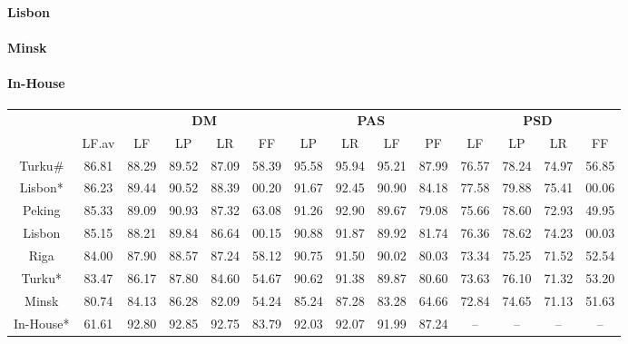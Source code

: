 \paragraph{Lisbon} 

\paragraph{Minsk}

\paragraph{In-House}


\begin{table}
    \centering
    \smaller[]
    \smaller[]
    \smaller[0.5]
    \begin{tabular}{@{}cccccccccccccc@{}}
        \toprule
        \multicolumn{1}{c}{ }
        & \multicolumn{1}{c}{ }
        & \multicolumn{4}{c}{\textbf{DM}}
        & \multicolumn{4}{c}{\textbf{PAS}}
        & \multicolumn{4}{c}{\textbf{PSD}} \\
        \cmidrule(lr){3-6}
        \cmidrule(lr){7-10}
        \cmidrule(lr){11-14}
        &
        LF.av &
        LF & LP & LR & FF &
        LP & LR & LF & PF &
        LF & LP & LR & FF \\
        \midrule
        Turku\# & 86.81 & 88.29 & 89.52 & 87.09 & 58.39 & 95.58 & 95.94 & 95.21 & 87.99 & 76.57 & 78.24 & 74.97 & 56.85 \\
        Lisbon* & 86.23 & 89.44 & 90.52 & 88.39 & 00.20 & 91.67 & 92.45 & 90.90 & 84.18 & 77.58 & 79.88 & 75.41 & 00.06 \\
        Peking & 85.33 & 89.09 & 90.93 & 87.32 & 63.08 & 91.26 & 92.90 & 89.67 & 79.08 & 75.66 & 78.60 & 72.93 & 49.95 \\
        Lisbon & 85.15 & 88.21 & 89.84 & 86.64 & 00.15 & 90.88 & 91.87 & 89.92 & 81.74 & 76.36 & 78.62 & 74.23 & 00.03 \\
        Riga & 84.00 & 87.90 & 88.57 & 87.24 & 58.12 & 90.75 & 91.50 & 90.02 & 80.03 & 73.34 & 75.25 & 71.52 & 52.54 \\
        Turku* & 83.47 & 86.17 & 87.80 & 84.60 & 54.67 & 90.62 & 91.38 & 89.87 & 80.60 & 73.63 & 76.10 & 71.32 & 53.20 \\
        Minsk & 80.74 & 84.13 & 86.28 & 82.09 & 54.24 & 85.24 & 87.28 & 83.28 & 64.66 & 72.84 & 74.65 & 71.13 & 51.63 \\
        In-House* & 61.61 & 92.80 & 92.85 & 92.75 & 83.79 & 92.03 & 92.07 & 91.99 & 87.24 & – & – & – & – \\
        \bottomrule
        

\end{tabular}
\end{table}
